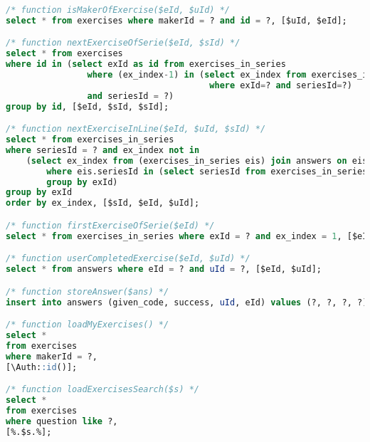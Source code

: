 \begin{lstlisting}[language=sql]
/* function isMakerOfExercise($eId, $uId) */
select * from exercises where makerId = ? and id = ?, [$uId, $eId];

/* function nextExerciseOfSerie($eId, $sId) */
select * from exercises
where id in (select exId as id from exercises_in_series
                where (ex_index-1) in (select ex_index from exercises_in_series
                                        where exId=? and seriesId=?)
                and seriesId = ?)
group by id, [$eId, $sId, $sId];

/* function nextExerciseInLine($eId, $uId, $sId) */
select * from exercises_in_series
where seriesId = ? and ex_index not in
    (select ex_index from (exercises_in_series eis) join answers on eis.exId = eId
        where eis.seriesId in (select seriesId from exercises_in_series where exId=?) and uId=?
        group by exId)
group by exId
order by ex_index, [$sId, $eId, $uId];

/* function firstExerciseOfSerie($eId) */
select * from exercises_in_series where exId = ? and ex_index = 1, [$eId];

/* function userCompletedExercise($eId, $uId) */
select * from answers where eId = ? and uId = ?, [$eId, $uId];

/* function storeAnswer($ans) */
insert into answers (given_code, success, uId, eId) values (?, ?, ?, ?), [$ans->given_code, $ans->success, $ans->uId, $ans->eId];

/* function loadMyExercises() */
select *
from exercises
where makerId = ?,
[\Auth::id()];

/* function loadExercisesSearch($s) */
select *
from exercises
where question like ?,
[%.$s.%];

\end{lstlisting}
